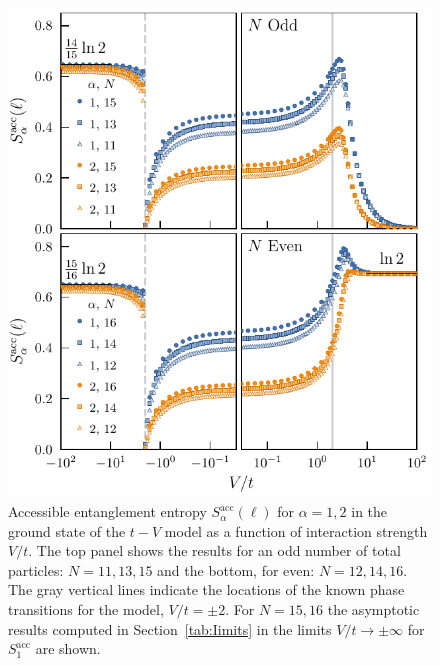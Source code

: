 %
\begin{figure}[h!]
\begin{center}
\includegraphics[scale=1.0]{operationalEntanglementEntropies_SOP5.pdf}
\end{center}
\caption{Accessible entanglement entropy $S_{\alpha}^{\mathrm{acc}}(\ell)$ for $\alpha = 1, 2$ in the ground state of the $t-V$ model as a function of interaction strength $V/t$. The top panel shows the results for an odd number of total particles: $N=11,13,15$ and the bottom, for even: $N=12,14,16$. The gray vertical lines indicate the locations of the known phase transitions for the model, $V/t = \pm 2$. For $N=15,16$ the asymptotic results computed in Section~\ref{tab:Iimits} in the limits $V/t \to \pm \infty$ for $S_{1}^{\mathrm{acc}}$ are shown.}
\label{fig:OEE}
 \end{figure}

